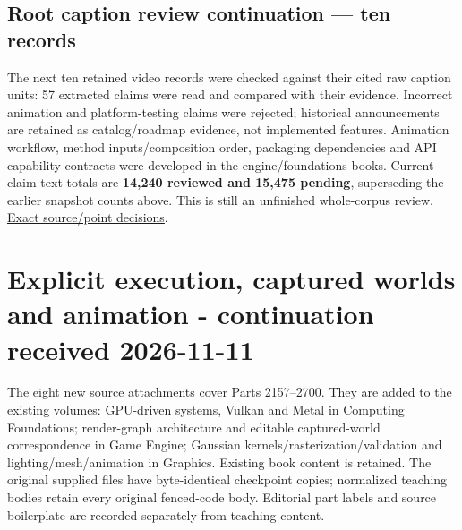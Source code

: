 \subsection{Root caption review continuation --- ten records}\label{appendix-3b67654799a2-root-caption-review-continuation-ten-records}

The next ten retained video records were checked against their cited raw caption units: 57 extracted claims were read and compared with their evidence. Incorrect animation and platform-testing claims were rejected; historical announcements are retained as catalog/roadmap evidence, not implemented features. Animation workflow, method inputs/composition order, packaging dependencies and API capability contracts were developed in the engine/foundations books. Current claim-text totals are \textbf{14,240 reviewed and 15,475 pending}, superseding the earlier snapshot counts above. This is still an unfinished whole-corpus review. \href{/Users/swayamsingal/.codex/source-cache/manual-integration-2026-11-10/math-repair-2026-11-11/caption-batch-01-review.json}{Exact source/point decisions}.

\section{Explicit execution, captured worlds and animation - continuation received 2026-11-11}\label{appendix-3b67654799a2-explicit-execution-captured-worlds-and-animation---continuation-received-2026-11-11}

The eight new source attachments cover Parts 2157--2700. They are added to the existing volumes: GPU-driven systems, Vulkan and Metal in Computing Foundations; render-graph architecture and editable captured-world correspondence in Game Engine; Gaussian kernels/rasterization/validation and lighting/mesh/animation in Graphics. Existing book content is retained. The original supplied files have byte-identical checkpoint copies; normalized teaching bodies retain every original fenced-code body. Editorial part labels and source boilerplate are recorded separately from teaching content.

